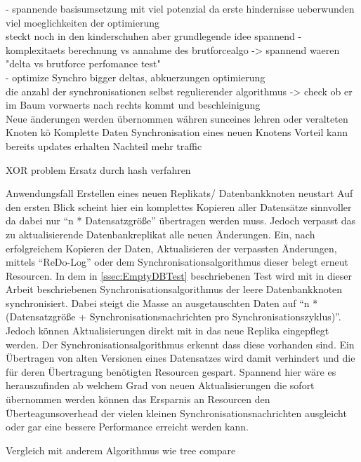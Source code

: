\documentclass[a4paper,11pt,oneside,%
headsepline,												%
footsepline,												%
bibtotocnumbered									%
]{scrreprt}
\begin{document}
- spannende basisumsetzung mit viel potenzial da erste hindernisse ueberwunden viel moeglichkeiten der optimierung\\ steckt noch in den kinderschuhen aber grundlegende idee spannend
- komplexitaets berechnung vs annahme des brutforcealgo -> spannend waeren "delta vs brutforce perfomance test"\\
- optimize Synchro bigger deltas, abkuerzungen optimierung\\

die anzahl der synchronisationen selbst regulierender algorithmus -> check ob er im Baum vorwaerts nach rechts kommt und beschleinigung\\

Neue änderungen werden übernommen währen sunceines lehren oder veralteten Knoten kö
Komplette Daten Synchronisation eines neuen Knotens Vorteil kann bereits updates erhalten Nachteil mehr traffic


XOR problem Ersatz durch hash verfahren

Anwendungsfall Erstellen eines neuen Replikats/ Datenbankknoten neustart
Auf den ersten Blick scheint hier ein komplettes Kopieren aller Datensätze sinnvoller da dabei nur \enquote{n * Datensatzgröße} übertragen werden muss. Jedoch verpasst das zu aktualisierende Datenbankreplikat alle neuen Änderungen. Ein, nach erfolgreichem Kopieren der Daten, Aktualisieren der verpassten Änderungen, mittels \enquote{ReDo-Log} oder dem Synchronisationsalgorithmus dieser belegt erneut Resourcen. In dem in \autoref{ssec:EmptyDBTest} beschriebenen Test wird mit in dieser Arbeit beschriebenen Synchronisationsalgorithmus der leere Datenbankknoten synchronisiert. Dabei steigt die Masse an ausgetauschten Daten auf \enquote{n * (Datensatzgröße + Synchronisationsnachrichten pro Synchronisationszyklus)}. Jedoch können Aktualisierungen direkt mit in das neue Replika eingepflegt werden. Der Synchronisationsalgorithmus erkennt dass diese vorhanden sind. Ein Übertragen von alten Versionen eines Datensatzes wird damit verhindert und die für deren Übertragung benötigten Resourcen gespart. Spannend hier wäre es herauszufinden ab welchem Grad von neuen Aktualisierungen die sofort übernommen werden können das Ersparnis an Resourcen den Überteagunsoverhead der vielen kleinen Synchronisationsnachrichten ausgleicht oder gar eine bessere Performance erreicht werden kann. 

Vergleich mit anderem Algorithmus wie tree compare
\newpage
\listoftodos[Notes]

\newpage
\printbibheading
\printbibliography[type=book,heading=subbibliography,title={Buch Quellen}]
\printbibliography[nottype=book,heading=subbibliography,title={Andere Quellen}]
\end{document}
